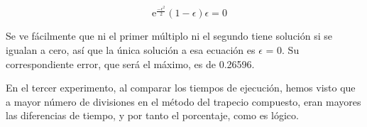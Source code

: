\[
\quad\text{e}^{\frac{-\epsilon^2}{2}} \displaystyle (1-\epsilon) \displaystyle \epsilon = 0
\]

Se ve fácilmente que ni el primer múltiplo ni el segundo tiene solución si se igualan a cero, así que la única solución a esa ecuación es $\epsilon$ = 0.
Su correspondiente error, que será el máximo, es de 0.26596.

En el tercer experimento, al comparar los tiempos de ejecución, hemos visto que a mayor número de divisiones en el método del trapecio compuesto, eran mayores las diferencias
 de tiempo, y por tanto el porcentaje, como es lógico. 

